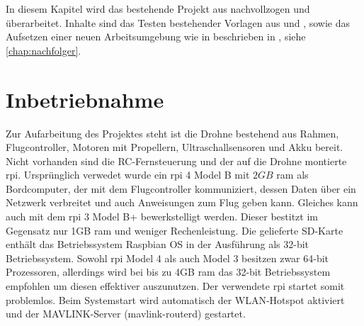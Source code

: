 In diesem Kapitel wird das bestehende Projekt aus nachvollzogen und überarbeitet. Inhalte sind das Testen bestehender Vorlagen aus \cite{wirthErweiterungBestehendenDrohne2022} und \cite{wirthErweiterungBestehendenDrohne2022a}, sowie das Aufsetzen einer neuen Arbeitsumgebung wie in beschrieben in \cite{haraldwirthNachfolgerInfoStudienarbeitAutonome2022}, siehe \cref{chap:nachfolger}.

\section{Inbetriebnahme}
Zur Aufarbeitung des Projektes steht ist die Drohne bestehend aus Rahmen, Flugcontroller, Motoren mit Propellern, Ultraschallsensoren und Akku bereit. Nicht vorhanden sind die RC-Fernsteuerung und der auf die Drohne montierte \gls{rpi}. Ursprünglich verwedet wurde ein \gls{rpi} 4 Model B mit $2GB$ \gls{ram} als Bordcomputer, der mit dem Flugcontroller kommuniziert, dessen Daten über ein Netzwerk verbreitet und auch Anweisungen zum Flug geben kann. Gleiches kann auch mit dem \gls{rpi} 3 Model B+ bewerkstelligt werden. Dieser bestitzt im Gegensatz nur 1GB \gls{ram} und weniger Rechenleistung.
Die gelieferte SD-Karte enthält das Betriebssystem Raspbian OS in der Ausführung als 32-bit Betriebssystem. Sowohl \gls{rpi} Model 4 als auch Model 3 besitzen zwar 64-bit Prozessoren, allerdings wird bei bis zu 4GB \gls{ram} das 32-bit Betriebssystem empfohlen um diesen effektiver auszunutzen.
Der verwendete \gls{rpi} startet somit problemlos.
Beim Systemstart wird automatisch der WLAN-Hotspot aktiviert und der MAVLINK-Server (mavlink-routerd) gestartet. %

